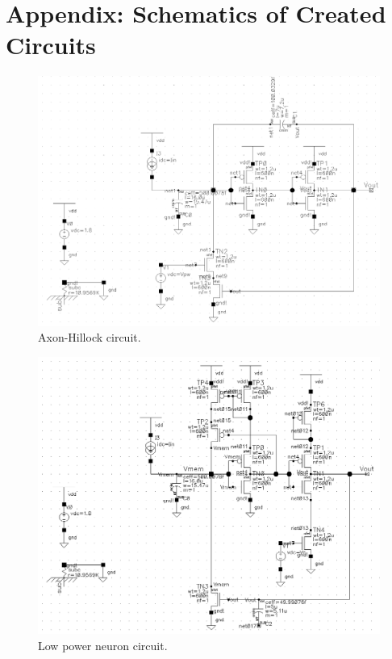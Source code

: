 \newpage
\appendix
\section{Appendix: Schematics of Created Circuits}
\begin{figure}[!h]
    \includegraphics[width=\textwidth]{axhil.png}
    \caption{Axon-Hillock circuit.}
\end{figure}
\begin{figure}[!h]
    \includegraphics[width=\textwidth]{soma_lowpower.png}
    \caption{Low power neuron circuit.}
\end{figure}

